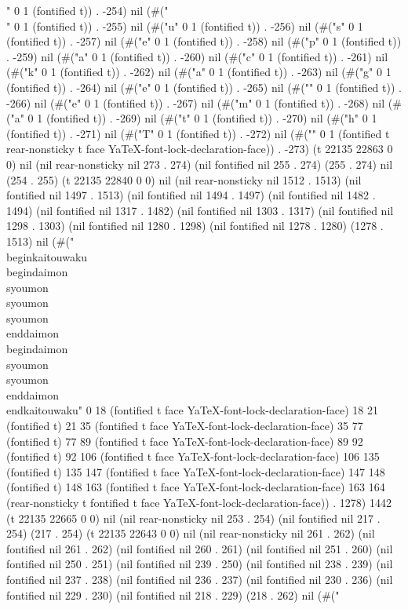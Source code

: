 {" 0 1 (fontified t)) . -254) nil (#("\\" 0 1 (fontified t)) . -255) nil (#("u" 0 1 (fontified t)) . -256) nil (#("s" 0 1 (fontified t)) . -257) nil (#("e" 0 1 (fontified t)) . -258) nil (#("p" 0 1 (fontified t)) . -259) nil (#("a" 0 1 (fontified t)) . -260) nil (#("c" 0 1 (fontified t)) . -261) nil (#("k" 0 1 (fontified t)) . -262) nil (#("a" 0 1 (fontified t)) . -263) nil (#("g" 0 1 (fontified t)) . -264) nil (#("e" 0 1 (fontified t)) . -265) nil (#("{" 0 1 (fontified t)) . -266) nil (#("e" 0 1 (fontified t)) . -267) nil (#("m" 0 1 (fontified t)) . -268) nil (#("a" 0 1 (fontified t)) . -269) nil (#("t" 0 1 (fontified t)) . -270) nil (#("h" 0 1 (fontified t)) . -271) nil (#("T" 0 1 (fontified t)) . -272) nil (#("}" 0 1 (fontified t rear-nonsticky t face YaTeX-font-lock-declaration-face)) . -273) (t 22135 22863 0 0) nil (nil rear-nonsticky nil 273 . 274) (nil fontified nil 255 . 274) (255 . 274) nil (254 . 255) (t 22135 22840 0 0) nil (nil rear-nonsticky nil 1512 . 1513) (nil fontified nil 1497 . 1513) (nil fontified nil 1494 . 1497) (nil fontified nil 1482 . 1494) (nil fontified nil 1317 . 1482) (nil fontified nil 1303 . 1317) (nil fontified nil 1298 . 1303) (nil fontified nil 1280 . 1298) (nil fontified nil 1278 . 1280) (1278 . 1513) nil (#("\\begin{kaitouwaku}
  \\begin{daimon}
    \\syoumon
    \\syoumon
    \\syoumon
  \\end{daimon}
  \\begin{daimon}
    \\syoumon
    \\syoumon
  \\end{daimon}
\\end{kaitouwaku}" 0 18 (fontified t face YaTeX-font-lock-declaration-face) 18 21 (fontified t) 21 35 (fontified t face YaTeX-font-lock-declaration-face) 35 77 (fontified t) 77 89 (fontified t face YaTeX-font-lock-declaration-face) 89 92 (fontified t) 92 106 (fontified t face YaTeX-font-lock-declaration-face) 106 135 (fontified t) 135 147 (fontified t face YaTeX-font-lock-declaration-face) 147 148 (fontified t) 148 163 (fontified t face YaTeX-font-lock-declaration-face) 163 164 (rear-nonsticky t fontified t face YaTeX-font-lock-declaration-face)) . 1278) 1442 (t 22135 22665 0 0) nil (nil rear-nonsticky nil 253 . 254) (nil fontified nil 217 . 254) (217 . 254) (t 22135 22643 0 0) nil (nil rear-nonsticky nil 261 . 262) (nil fontified nil 261 . 262) (nil fontified nil 260 . 261) (nil fontified nil 251 . 260) (nil fontified nil 250 . 251) (nil fontified nil 239 . 250) (nil fontified nil 238 . 239) (nil fontified nil 237 . 238) (nil fontified nil 236 . 237) (nil fontified nil 230 . 236) (nil fontified nil 229 . 230) (nil fontified nil 218 . 229) (218 . 262) nil (#("%
}
